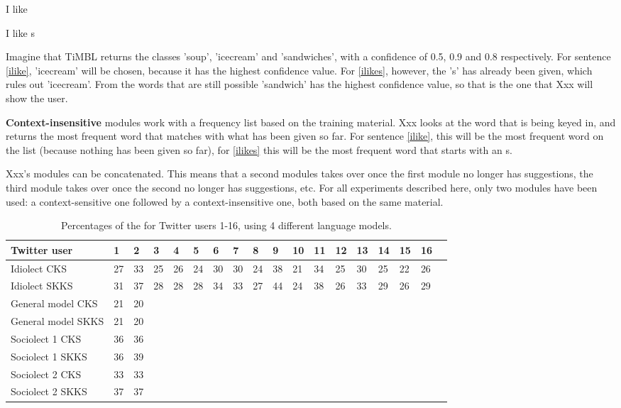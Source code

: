 \documentclass[11pt]{article}
\begin{document}
\begin{examples}
\item I like \label{ilike}
\item I like s \label{ilikes}
\end{examples}

Imagine that TiMBL returns the classes 'soup', 'icecream' and 'sandwiches', with a confidence of 0.5, 0.9 and 0.8 respectively. For sentence \ref{ilike}, 'icecream' will be chosen, because it has the highest confidence value. For \ref{ilikes}, however, the 's' has already been given, which rules out 'icecream'. From the words that are still possible 'sandwich' has the highest confidence value, so that is the one that Xxx will show the user.

\textbf{Context-insensitive} modules work with a frequency list based on the training material. Xxx looks at the word that is being keyed in, and returns the most frequent word that matches with what has been given so far. For sentence \ref{ilike}, this will be the most frequent word on the list (because nothing has been given so far), for \ref{ilikes} this will be the most frequent word that starts with an s.

Xxx's modules can be concatenated. This means that a second modules takes over once the first module no longer has suggestions, the third module takes over once the second no longer has suggestions, etc. For all experiments described here, only two modules have been used: a context-sensitive one followed by a context-insensitive one, both based on the same material.

\begin{table*}[t]
\begin{tabular}{l|*{17}{l}}
Twitter user&1&2&3&4&5&6&7&8&9&10&11&12&13&14&15&16\\
\hline
Idiolect CKS&27&33&25&26&24&30&30&24&38&21&34&25&30&25&22&26\\
Idiolect SKKS&31&37&28&28&28&34&33&27&44&24&38&26&33&29&26&29\\
\hline
General model CKS&21&20\\
General model SKKS&21&20\\
\hline
Sociolect 1 CKS&36&36\\
Sociolect 1 SKKS&36&39\\
\hline
Sociolect 2 CKS&33&33\\
Sociolect 2 SKKS&37&37\\
\end{tabular}
\caption{Percentages of the for Twitter users 1-16, using 4 different language models.}
\label{result1}
\end{table*}
\end{document}

